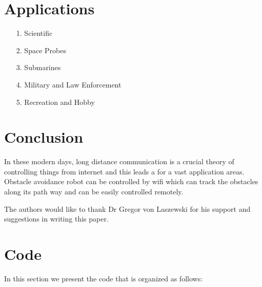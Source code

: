 \section{Applications}
\begin{itemize}
    \item[1.] Scientific
    \item[2.] Space Probes
    \item[3.] Submarines
    \item[4.] Military and Law Enforcement
    \item[5.] Recreation and Hobby
\end{itemize}

\section{Conclusion}
In these modern days, long distance communication is a crucial theory of 
controlling things from internet and this leads a for a vast application 
areas. Obstacle avoidance robot can be controlled by wifi which can track 
the obstacles along its path way and can be easily controlled remotely.

\begin{acks}

The authors would like to thank Dr Gregor von Laszewski for his support 
and suggestions in writing this paper.

\end{acks}


 

\appendix

\section{Code}

In this section we present the code that is organized as follows:

